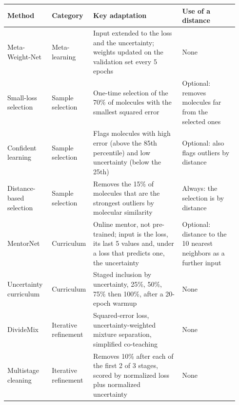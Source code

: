 \begin{table}[htbp]
\centering
\small
\begin{adjustbox}{max width=\textwidth,max totalheight=0.85\textheight}
\begin{tabular}{@{}P{0.19\linewidth}P{0.13\linewidth}P{0.38\linewidth}P{0.24\linewidth}@{}}
\toprule
Method & Category & Key adaptation & Use of a distance \\
\midrule
Meta-Weight-Net & Meta-learning & Input extended to the loss and the uncertainty; weights updated on the validation set every 5 epochs & None \\
Small-loss selection & Sample selection & One-time selection of the 70\% of molecules with the smallest squared error & Optional: removes molecules far from the selected ones \\
Confident learning & Sample selection & Flags molecules with high error (above the 85th percentile) and low uncertainty (below the 25th) & Optional: also flags outliers by distance \\
Distance-based selection & Sample selection & Removes the 15\% of molecules that are the strongest outliers by molecular similarity & Always: the selection is by distance \\
MentorNet & Curriculum & Online mentor, not pre-trained; input is the loss, its last 5 values and, under a loss that predicts one, the uncertainty & Optional: distance to the 10 nearest neighbors as a further input \\
Uncertainty curriculum & Curriculum & Staged inclusion by uncertainty, 25\%, 50\%, 75\% then 100\%, after a 20-epoch warmup & None \\
DivideMix & Iterative refinement & Squared-error loss, uncertainty-weighted mixture separation, simplified co-teaching & None \\
Multistage cleaning & Iterative refinement & Removes 10\% after each of the first 2 of 3 stages, scored by normalized loss plus normalized uncertainty & None \\

\end{tabular}
\end{adjustbox}
\end{table}
